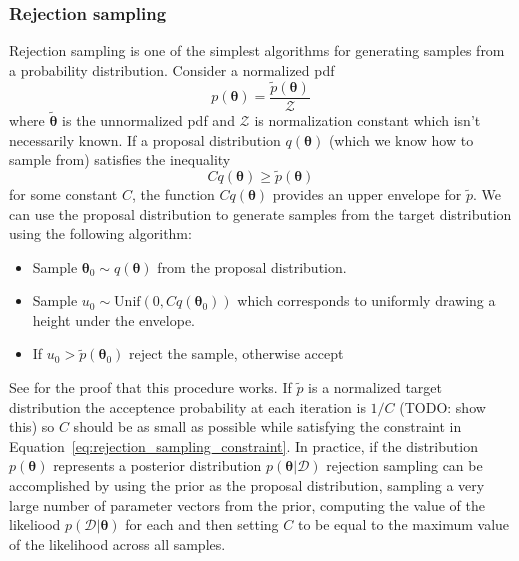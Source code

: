 \documentclass[12pt,dvipsnames]{report}
\renewcommand{\vec}[1]{\boldsymbol{\mathbf{#1}}}
\begin{document}
\subsubsection{Rejection sampling}
Rejection sampling is one of the simplest algorithms for generating samples
from a probability distribution. Consider a normalized pdf
\begin{equation}
    p(\vec{\theta})=\frac{\tilde{p}(\vec{\theta})}{\mathcal{Z}}
\end{equation}
where $\tilde{\vec{\theta}}$ is the unnormalized pdf and $\mathcal{Z}$ is normalization
constant which isn't necessarily known.
If a proposal distribution $q(\vec{\theta})$ (which we know how to sample from)
satisfies the inequality
\begin{equation}
    Cq(\vec{\theta})\geq \tilde{p}(\vec{\theta})
    \label{eq:rejection_sampling_constraint}
\end{equation}
for some constant $C$, the function $Cq(\vec{\theta})$ provides an upper envelope for
$\tilde{p}$. We can use the proposal distribution to generate samples from the target
distribution using the following algorithm:
\begin{itemize}
    \item Sample $\vec{\theta}_0\sim q(\vec{\theta})$ from the proposal distribution.
    \item Sample $u_0\sim \mathrm{Unif}(0, Cq(\vec{\theta}_0))$ which corresponds to
          uniformly drawing a height under the envelope.
    \item If $u_0>\tilde{p}(\vec{\theta}_0)$ reject the sample, otherwise accept
\end{itemize}
See \citet{murphy_book_2023} for the proof that this procedure works.
If $\tilde{p}$ is a normalized target distribution the acceptence probability at
each iteration is  $1/C$ (TODO: show this) so  $C$ should be as small as possible
while satisfying the constraint in Equation~\ref{eq:rejection_sampling_constraint}.
In practice, if the distribution $p(\vec{\theta})$ represents a posterior distribution
$p(\vec{\theta}\lvert \mathcal{D})$ rejection sampling can be accomplished by using
the prior as the proposal distribution, sampling a very large number of parameter
vectors from the prior, computing the value of the likeliood
$p(\mathcal{D} \lvert\vec{\theta})$ for each and then setting $C$ to be equal to the
maximum value of the likelihood across all samples.
\end{document}
